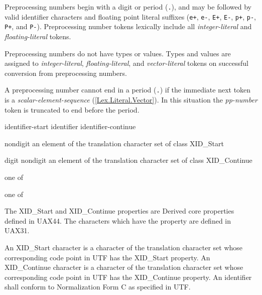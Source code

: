 \p Preprocessing numbers begin with a digit or period (\texttt{.}), and may be
followed by valid identifier characters and floating point literal suffixes
(\texttt{e+}, \texttt{e-}, \texttt{E+}, \texttt{E-}, \texttt{p+}, \texttt{p-},
\texttt{P+}, and \texttt{P-}). Preprocessing number tokens lexically include all
\textit{integer-literal} and \textit{floating-literal} tokens.

\p Preprocessing numbers do not have types or values. Types and values are
assigned to \textit{integer-literal}, \textit{floating-literal}, and
\textit{vector-literal} tokens on successful conversion from preprocessing
numbers.

\p A preprocessing number cannot end in a period (\texttt{.}) if the immediate
next token is a \textit{scalar-element-sequence} (\ref{Lex.Literal.Vector}). In
this situation the \textit{pp-number} token is truncated to end before the
period.


\begin{grammar}
  \br
  identifier-start\br
  identifier identifier-continue

  \br
  nondigit\br
  \textnormal{an element of the translation character set of class XID\_Start}

  \br
  digit\br
  nondigit\br
  \textnormal{an element of the translation character set of class XID\_Continue}

   \textnormal{one of}\br
  \br
  \br
  \br

   \textnormal{one of}\br
\end{grammar}

\p The XID\_Start and XID\_Continue properties are Derived core properties defined
in \gls{UAX44}. The characters which have the property are defined in
\gls{UAX31}.

\p An XID\_Start character is a character of the translation character set whose
corresponding code point in \gls{UTF} has the XID\_Start property. An
XID\_Continue character is a character of the translation character set whose
corresponding code point in \gls{UTF} has the XID\_Continue property. An identifier
shall conform to Normalization Form C as specified in \gls{UTF}.

